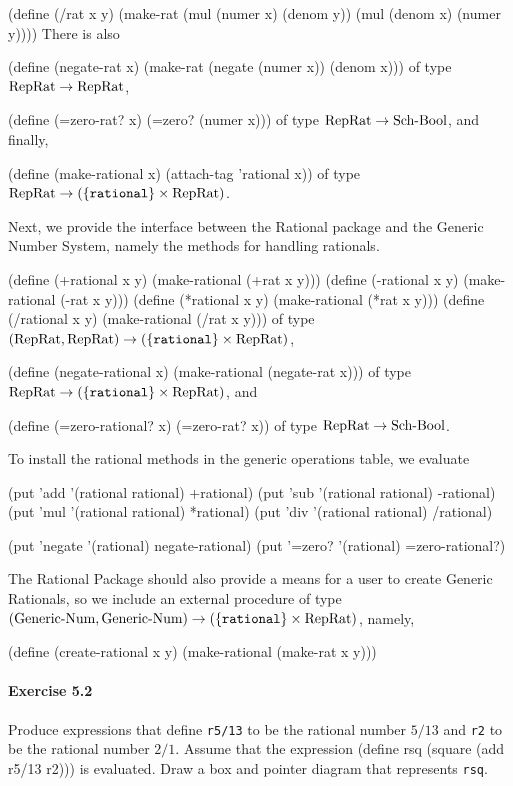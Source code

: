 (define (/rat x y)
  (make-rat (mul (numer x) (denom y))
            (mul (denom x) (numer y))))
\endlisp
There is also

\beginlisp
(define (negate-rat x)
  (make-rat (negate (numer x))
            (denom x)))
\endlisp
of type $\mbox{RepRat} \rightarrow \mbox{RepRat}$,

\beginlisp
(define (=zero-rat? x)
  (=zero? (numer x)))
\endlisp
of type $\mbox{RepRat} \rightarrow \mbox{Sch-\-Bool}$, and finally,

\beginlisp
(define (make-rational x) (attach-tag 'rational x))
\endlisp
of type $\mbox{RepRat} \rightarrow (\{\mbox{\tt rational}\}\times\mbox{RepRat})$.

Next, we provide the interface between the Rational package and the
Generic Number System, namely the methods for handling rationals.

\beginlisp
(define (+rational x y) (make-rational (+rat x y)))
(define (-rational x y) (make-rational (-rat x y)))
(define (*rational x y) (make-rational (*rat x y)))
(define (/rational x y) (make-rational (/rat x y)))
\endlisp
of type $(\mbox{RepRat}, \mbox{RepRat}) \rightarrow (\{\mbox{\tt rational}\}\times\mbox{RepRat})$,

\beginlisp
(define (negate-rational x) (make-rational (negate-rat x)))
\endlisp
of type $\mbox{RepRat} \rightarrow (\{\mbox{\tt rational}\}\times\mbox{RepRat})$, and

\beginlisp
(define (=zero-rational? x) (=zero-rat? x))
\endlisp
of type $\mbox{RepRat} \rightarrow \mbox{Sch-\-Bool}$.

To install the rational methods in the generic operations table, we evaluate

\beginlisp
(put 'add '(rational rational) +rational)
(put 'sub '(rational rational) -rational)
(put 'mul '(rational rational) *rational)
(put 'div '(rational rational) /rational)

(put 'negate '(rational) negate-rational)
(put '=zero? '(rational) =zero-rational?)
\endlisp

The Rational Package should also provide a means for a user to create
Generic Rationals, so we include an external procedure of type
$(\mbox{Generic-\-Num},\mbox{Generic-\-Num}) \rightarrow (\{\mbox{\tt rational}\}\times\mbox{RepRat})$, namely,

\beginlisp
(define (create-rational x y)
   (make-rational (make-rat x y)))
\endlisp


\paragraph{Exercise 5.2}
Produce expressions that define {\tt r5/13} to be the rational number $5/13$
and {\tt r2} to be the rational number $2/1$.  Assume that the expression
\beginlisp
(define rsq (square (add r5/13 r2)))
\endlisp
is evaluated.  Draw a box and pointer diagram that represents {\tt rsq}.

